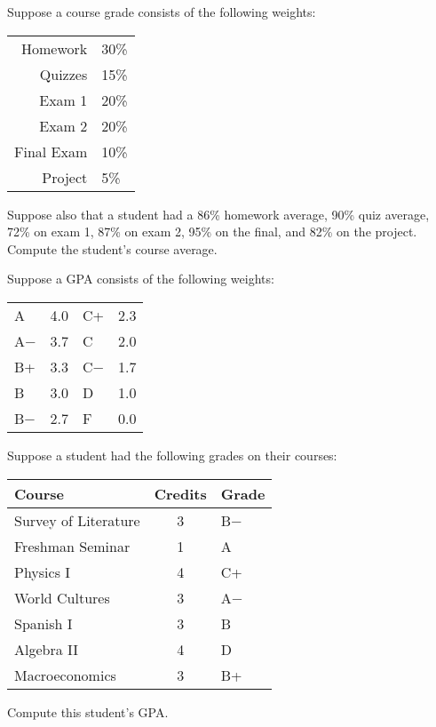 \documentclass[11pt,letterpaper]{article}
\begin{document}

 Suppose a course grade consists of the following weights:
	\begin{table}[!ht]
	\centering
	\begin{tabular}{rl}
	Homework & 30\% \\
	Quizzes & 15\% \\
	Exam 1 & 20\% \\
	Exam 2 & 20\% \\
	Final Exam & 10\% \\
	Project & 5\%
	\end{tabular}
	\end{table} \par
Suppose also that a student had a 86\% homework average, 90\% quiz average, 72\% on exam 1, 87\% on exam 2, 95\% on the final, and 82\% on the project. Compute the student's course average.
	



\newpage



 Suppose a GPA consists of the following weights:
	\begin{table}[!ht]
	\centering
	\begin{tabular}{lr|lr}
	A & 4.0 & C+ & 2.3 \\
	A$-$ & 3.7 & C & 2.0 \\
	B+ & 3.3 & C$-$ & 1.7 \\
	B & 3.0 & D & 1.0 \\
	B$-$ & 2.7 & F & 0.0
	\end{tabular}
	\end{table} \par
Suppose a student had the following grades on their courses:
	\begin{table}[!ht]
	\centering
	\begin{tabular}{lcl}
	Course & Credits & Grade \\ \hline
	Survey of Literature & 3 & B$-$ \\
	Freshman Seminar & 1 & A \\
	Physics I & 4 & C+ \\
	World Cultures & 3 & A$-$ \\
	Spanish I & 3 & B \\
	Algebra II & 4 & D \\
	Macroeconomics & 3 & B+
	\end{tabular}
	\end{table}
Compute this student's GPA.
\end{document}
